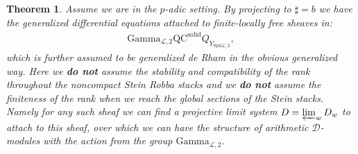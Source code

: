 \documentclass[12pt]{article}
\newtheorem{theorem}{Theorem}
\theoremstyle{definition}
\begin{document}
\begin{theorem}
Assume we are in the $p$-adic setting. By projecting to $\sharp=b$ we have the generalized differential equations attached to finite-locally free sheaves in:
\begin{align}
\mathrm{Gamma}_{\mathcal{L},2}\mathrm{QC}^\mathrm{solid}Q_{Y_{\mathrm{Spd}\mathcal{L},2}},
\end{align}
which is further assumed to be generalized de Rham in the obvious generalized way. Here we \textbf{do not} assume the stability and compatibility of the rank throughout the noncompact Stein Robba stacks and we \textbf{do not} assume the finiteness of the rank when we reach the global sections of the Stein stacks. Namely for any such sheaf we can find a projective limit system $D=\varprojlim_w D_w$ to attach to this sheaf, over which we can have the structure of arithmetic $\mathcal{D}$-modules with the action from the group $\mathrm{Gamma}_{\mathcal{L},2}$. 
\end{theorem}
\end{document}
